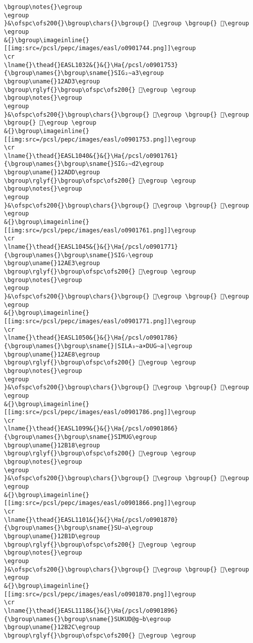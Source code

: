 \begin{verbatim}
\bgroup\notes{}\egroup
\egroup
}&\ofspc\ofs200{}\bgroup\chars{}\bgroup{} 𒫍\egroup \bgroup{} 𒫎\egroup \egroup
&{}\bgroup\imageinline{}[[img:src=/pcsl/pepc/images/easl/o0901744.png]]\egroup
\cr
\lname{}\thead{}EASL1032&{}&{}\Ha{/pcsl/o0901753}{\bgroup\names{}\bgroup\sname{}SIG₂∼a3\egroup
\bgroup\uname{}12AD3\egroup
\bgroup\rglyf{}\bgroup\ofspc\ofs200{} 𒫓\egroup \egroup
\bgroup\notes{}\egroup
\egroup
}&\ofspc\ofs200{}\bgroup\chars{}\bgroup{} 𒫓\egroup \bgroup{} 𒫔\egroup \bgroup{} 𒫕\egroup \egroup
&{}\bgroup\imageinline{}[[img:src=/pcsl/pepc/images/easl/o0901753.png]]\egroup
\cr
\lname{}\thead{}EASL1040&{}&{}\Ha{/pcsl/o0901761}{\bgroup\names{}\bgroup\sname{}SIG₂∼d2\egroup
\bgroup\uname{}12ADD\egroup
\bgroup\rglyf{}\bgroup\ofspc\ofs200{} 𒫝\egroup \egroup
\bgroup\notes{}\egroup
\egroup
}&\ofspc\ofs200{}\bgroup\chars{}\bgroup{} 𒫝\egroup \bgroup{} 𒫞\egroup \egroup
&{}\bgroup\imageinline{}[[img:src=/pcsl/pepc/images/easl/o0901761.png]]\egroup
\cr
\lname{}\thead{}EASL1045&{}&{}\Ha{/pcsl/o0901771}{\bgroup\names{}\bgroup\sname{}SIG₇\egroup
\bgroup\uname{}12AE3\egroup
\bgroup\rglyf{}\bgroup\ofspc\ofs200{} 𒫣\egroup \egroup
\bgroup\notes{}\egroup
\egroup
}&\ofspc\ofs200{}\bgroup\chars{}\bgroup{} 𒫣\egroup \bgroup{} 𒫤\egroup \egroup
&{}\bgroup\imageinline{}[[img:src=/pcsl/pepc/images/easl/o0901771.png]]\egroup
\cr
\lname{}\thead{}EASL1050&{}&{}\Ha{/pcsl/o0901786}{\bgroup\names{}\bgroup\sname{}|SILA₃∼a×DUG∼a|\egroup
\bgroup\uname{}12AE8\egroup
\bgroup\rglyf{}\bgroup\ofspc\ofs200{} 𒫨\egroup \egroup
\bgroup\notes{}\egroup
\egroup
}&\ofspc\ofs200{}\bgroup\chars{}\bgroup{} 𒬉\egroup \bgroup{} 𒫨\egroup \egroup
&{}\bgroup\imageinline{}[[img:src=/pcsl/pepc/images/easl/o0901786.png]]\egroup
\cr
\lname{}\thead{}EASL1099&{}&{}\Ha{/pcsl/o0901866}{\bgroup\names{}\bgroup\sname{}SIMUG\egroup
\bgroup\uname{}12B18\egroup
\bgroup\rglyf{}\bgroup\ofspc\ofs200{} 𒬘\egroup \egroup
\bgroup\notes{}\egroup
\egroup
}&\ofspc\ofs200{}\bgroup\chars{}\bgroup{} 𒬘\egroup \bgroup{} 𒬙\egroup \egroup
&{}\bgroup\imageinline{}[[img:src=/pcsl/pepc/images/easl/o0901866.png]]\egroup
\cr
\lname{}\thead{}EASL1101&{}&{}\Ha{/pcsl/o0901870}{\bgroup\names{}\bgroup\sname{}SU∼a\egroup
\bgroup\uname{}12B1D\egroup
\bgroup\rglyf{}\bgroup\ofspc\ofs200{} 𒬝\egroup \egroup
\bgroup\notes{}\egroup
\egroup
}&\ofspc\ofs200{}\bgroup\chars{}\bgroup{} 𒬛\egroup \bgroup{} 𒬝\egroup \egroup
&{}\bgroup\imageinline{}[[img:src=/pcsl/pepc/images/easl/o0901870.png]]\egroup
\cr
\lname{}\thead{}EASL1118&{}&{}\Ha{/pcsl/o0901896}{\bgroup\names{}\bgroup\sname{}SUKUD@g∼b\egroup
\bgroup\uname{}12B2C\egroup
\bgroup\rglyf{}\bgroup\ofspc\ofs200{} 𒬬\egroup \egroup

\end{verbatim}
